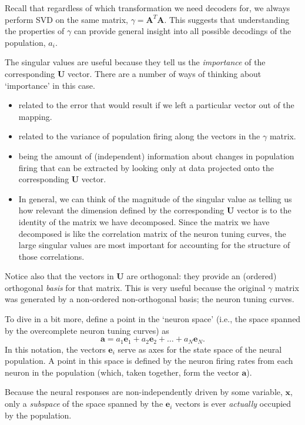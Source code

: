 \documentclass[10pt,letterpaper,oneside]{article}
\begin{document}
Recall that regardless of which transformation we need decoders for,
we always perform SVD on the same matrix, $\gamma=\mathbf{A}^{T}\mathbf{A}$.
This suggests that understanding the properties of $\gamma$ can provide
general insight into all possible decodings of the population, $a_{i}$. 

The singular values are useful because they tell us the \emph{importance}
of the corresponding $\mathbf{U}$ vector. There are a number of ways
of thinking about `importance' in this case. 

\begin{itemize}
\item related to the error that would result if we left a particular vector
out of the mapping. 
\item related to the variance of population firing along the vectors in
the $\gamma$ matrix. 
\item being the amount of (independent) information about changes in population
firing that can be extracted by looking only at data projected onto
the corresponding $\mathbf{U}$ vector.
\item In general, we can think of the magnitude of the singular value as
telling us how relevant the dimension defined by the corresponding
$\mathbf{U}$ vector is to the identity of the matrix we have decomposed.
Since the matrix we have decomposed is like the correlation matrix
of the neuron tuning curves, the large singular values are most important
for accounting for the structure of those correlations. 
\end{itemize}

Notice also that the vectors in $\mathbf{U}$ are orthogonal: they
provide an (ordered) orthogonal \emph{basis} for that matrix. This
is very useful because the original \textbf{$\gamma$} matrix was
generated by a non-ordered non-orthogonal basis; the neuron tuning
curves. 

To dive in a bit more, define a point in the `neuron space' (i.e., the
space spanned by the overcomplete neuron tuning curves) as
\[
\mathbf{a}=a_{1}\mathbf{e}_{1}+a_{2}\mathbf{e}_{2}+\ldots+a_{N}\mathbf{e}_{N}.
\]
In this notation, the vectors $\mathbf{e}_{i}$ serve as axes for
the state space of the neural population. A point in this space is
defined by the neuron firing rates from each neuron in the population
(which, taken together, form the vector $\mathbf{a}$). 

Because the neural responses are non-independently driven by some
variable, $\mathbf{x}$, only a \emph{subspace} of the space spanned
by the $\mathbf{e}_{i}$ vectors is ever \emph{actually} occupied
by the population.
\end{document}
